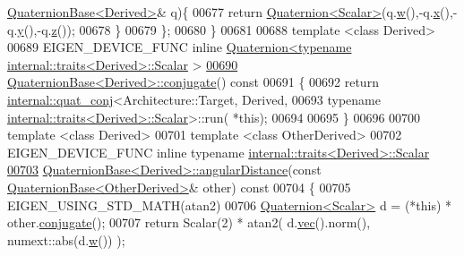 \begin{DoxyCode}
{      \hyperlink{group___geometry___module_class_eigen_1_1_quaternion_base}{QuaternionBase<Derived>}& q)\{
00677     \textcolor{keywordflow}{return} \hyperlink{group___geometry___module_class_eigen_1_1_quaternion}{Quaternion<Scalar>}(q.\hyperlink{group___geometry___module_a1f3f580927483150d4558c327988a9b4}{w}(),-q.\hyperlink{group___geometry___module_a782b9d83caa9bbe84d6e0b822f2dbea9}{x}(),-q.\hyperlink{group___geometry___module_a8c7883015c5fa41aa5107350279a5229}{y}(),-q.\hyperlink{group___geometry___module_abb82ebd1b6ac5e6c4442201ede65449b}{z}());
00678   \}
00679 \};
00680 \}
00681                          
00688 \textcolor{keyword}{template} <\textcolor{keyword}{class} Derived>
00689 EIGEN\_DEVICE\_FUNC \textcolor{keyword}{inline} \hyperlink{group___geometry___module_class_eigen_1_1_quaternion}{Quaternion<typename internal::traits<Derived>::Scalar}
      >
\hyperlink{group___geometry___module_aa82dabadce488031c298a5a0a92cda14}{00690} \hyperlink{group___geometry___module_aa82dabadce488031c298a5a0a92cda14}{QuaternionBase<Derived>::conjugate}()\textcolor{keyword}{ const}
00691 \textcolor{keyword}{}\{
00692   \textcolor{keywordflow}{return} \hyperlink{struct_eigen_1_1internal_1_1quat__conj}{internal::quat\_conj}<Architecture::Target, Derived,
00693                          \textcolor{keyword}{typename} \hyperlink{struct_eigen_1_1internal_1_1traits}{internal::traits<Derived>::Scalar}>::run(
      *\textcolor{keyword}{this});
00694                          
00695 \}
00696 
00700 \textcolor{keyword}{template} <\textcolor{keyword}{class} Derived>
00701 \textcolor{keyword}{template} <\textcolor{keyword}{class} OtherDerived>
00702 EIGEN\_DEVICE\_FUNC \textcolor{keyword}{inline} \textcolor{keyword}{typename} \hyperlink{struct_eigen_1_1internal_1_1traits}{internal::traits<Derived>::Scalar}
\hyperlink{group___geometry___module_a1731ca642b043f994f7cf2db398b2c0a}{00703} \hyperlink{group___geometry___module_class_eigen_1_1_quaternion_base}{QuaternionBase<Derived>::angularDistance}(\textcolor{keyword}{const} 
      \hyperlink{group___geometry___module_class_eigen_1_1_quaternion_base}{QuaternionBase<OtherDerived>}& other)\textcolor{keyword}{ const}
00704 \textcolor{keyword}{}\{
00705   EIGEN\_USING\_STD\_MATH(atan2)
00706   \hyperlink{group___geometry___module_class_eigen_1_1_quaternion}{Quaternion<Scalar>} d = (*this) * other.\hyperlink{group___geometry___module_aa82dabadce488031c298a5a0a92cda14}{conjugate}();
00707   \textcolor{keywordflow}{return} Scalar(2) * atan2( d.\hyperlink{group___geometry___module_aa8a52640dfd34f910d18f110ccccd1b9}{vec}().norm(), numext::abs(d.\hyperlink{group___geometry___module_a1f3f580927483150d4558c327988a9b4}{w}()) );
}
\end{DoxyCode}
